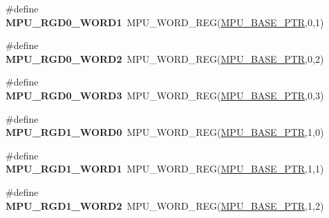 \begin{DoxyCompactItemize}
\item 
\hypertarget{group___m_p_u___register___accessor___macros_ga99e9dac3fdad036a0867a13fa907b46a}{}\#define {\bfseries M\+P\+U\+\_\+\+R\+G\+D0\+\_\+\+W\+O\+R\+D1}~M\+P\+U\+\_\+\+W\+O\+R\+D\+\_\+\+R\+E\+G(\hyperlink{group___m_p_u___peripheral_gae2d60f80178d84225d77e5f0214d1f1d}{M\+P\+U\+\_\+\+B\+A\+S\+E\+\_\+\+P\+T\+R},0,1)\label{group___m_p_u___register___accessor___macros_ga99e9dac3fdad036a0867a13fa907b46a}

\item 
\hypertarget{group___m_p_u___register___accessor___macros_gaad62e3247717439d9ecc100f15791acb}{}\#define {\bfseries M\+P\+U\+\_\+\+R\+G\+D0\+\_\+\+W\+O\+R\+D2}~M\+P\+U\+\_\+\+W\+O\+R\+D\+\_\+\+R\+E\+G(\hyperlink{group___m_p_u___peripheral_gae2d60f80178d84225d77e5f0214d1f1d}{M\+P\+U\+\_\+\+B\+A\+S\+E\+\_\+\+P\+T\+R},0,2)\label{group___m_p_u___register___accessor___macros_gaad62e3247717439d9ecc100f15791acb}

\item 
\hypertarget{group___m_p_u___register___accessor___macros_gac6e06b12f22cc8b792dd81c64e89b9da}{}\#define {\bfseries M\+P\+U\+\_\+\+R\+G\+D0\+\_\+\+W\+O\+R\+D3}~M\+P\+U\+\_\+\+W\+O\+R\+D\+\_\+\+R\+E\+G(\hyperlink{group___m_p_u___peripheral_gae2d60f80178d84225d77e5f0214d1f1d}{M\+P\+U\+\_\+\+B\+A\+S\+E\+\_\+\+P\+T\+R},0,3)\label{group___m_p_u___register___accessor___macros_gac6e06b12f22cc8b792dd81c64e89b9da}

\item 
\hypertarget{group___m_p_u___register___accessor___macros_gaa2ea4b1856e054ee15efee4860427d10}{}\#define {\bfseries M\+P\+U\+\_\+\+R\+G\+D1\+\_\+\+W\+O\+R\+D0}~M\+P\+U\+\_\+\+W\+O\+R\+D\+\_\+\+R\+E\+G(\hyperlink{group___m_p_u___peripheral_gae2d60f80178d84225d77e5f0214d1f1d}{M\+P\+U\+\_\+\+B\+A\+S\+E\+\_\+\+P\+T\+R},1,0)\label{group___m_p_u___register___accessor___macros_gaa2ea4b1856e054ee15efee4860427d10}

\item 
\hypertarget{group___m_p_u___register___accessor___macros_ga01811cf8e5e1c693e72661fbd0c8381b}{}\#define {\bfseries M\+P\+U\+\_\+\+R\+G\+D1\+\_\+\+W\+O\+R\+D1}~M\+P\+U\+\_\+\+W\+O\+R\+D\+\_\+\+R\+E\+G(\hyperlink{group___m_p_u___peripheral_gae2d60f80178d84225d77e5f0214d1f1d}{M\+P\+U\+\_\+\+B\+A\+S\+E\+\_\+\+P\+T\+R},1,1)\label{group___m_p_u___register___accessor___macros_ga01811cf8e5e1c693e72661fbd0c8381b}

\item 
\hypertarget{group___m_p_u___register___accessor___macros_gac317cfc09a60a9931baa051eb230c8df}{}\#define {\bfseries M\+P\+U\+\_\+\+R\+G\+D1\+\_\+\+W\+O\+R\+D2}~M\+P\+U\+\_\+\+W\+O\+R\+D\+\_\+\+R\+E\+G(\hyperlink{group___m_p_u___peripheral_gae2d60f80178d84225d77e5f0214d1f1d}{M\+P\+U\+\_\+\+B\+A\+S\+E\+\_\+\+P\+T\+R},1,2)\label{group___m_p_u___register___accessor___macros_gac317cfc09a60a9931baa051eb230c8df}


\end{DoxyCompactItemize}
